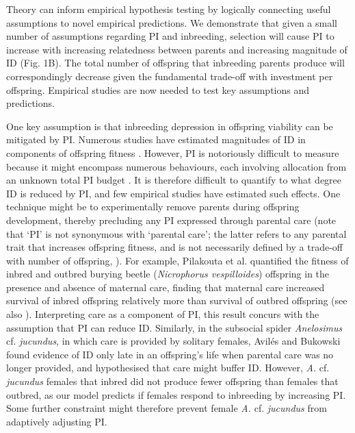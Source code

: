 \documentclass[12pt]{article}
\begin{document}
Theory can inform empirical hypothesis testing by logically connecting useful assumptions to novel empirical predictions. We demonstrate that given a small number of assumptions regarding PI and inbreeding, selection will cause PI to increase with increasing relatedness between parents and increasing magnitude of ID (Fig. 1B). The total number of offspring that inbreeding parents produce will correspondingly decrease given the fundamental trade-off with investment per offspring. Empirical studies are now needed to test key assumptions and predictions.

One key assumption is that inbreeding depression in offspring viability can be mitigated by PI. Numerous studies have estimated magnitudes of ID in components of offspring fitness \cite[][]{Keller2002, Charlesworth2009, Szulkin2012}. However, PI is notoriously difficult to measure because it might encompass numerous behaviours, each involving allocation from an unknown total PI budget \cite[][]{Parker2002}. It is therefore difficult to quantify to what degree ID is reduced by PI, and few empirical studies have estimated such effects. One technique might be to experimentally remove parents during offspring development, thereby precluding any PI expressed through parental care (note that `PI' is not synonymous with `parental care'; the latter refers to any parental trait that increases offspring fitness, and is not necessarily defined by a trade-off with number of offspring, \cite[][]{Gardner2011a, Royle2012}). For example, Pilakouta et al. \cite{Pilakouta2015} quantified the fitness of inbred and outbred burying beetle (\textit{Nicrophorus vespilloides}) offspring in the presence and absence of maternal care, finding that maternal care increased survival of inbred offspring relatively more than survival of outbred offspring (see also \cite{Pilakouta2016}). Interpreting care as a component of PI, this result concurs with the assumption that PI can reduce ID. Similarly, in the subsocial spider \textit{Anelosimus} cf. \textit{jucundus}, in which care is provided by solitary females, Avil{\'{e}}s and Bukowski \cite{Aviles2006} found evidence of ID only late in an offspring's life when parental care was no longer provided, and hypothesised that care might buffer ID. However, \textit{A.} cf. \textit{jucundus} females that inbred did not produce fewer offspring than females that outbred, as our model predicts if females respond to inbreeding by increasing PI. Some further constraint might therefore prevent female \textit{A.} cf. \textit{jucundus} from adaptively adjusting PI.
\end{document}
